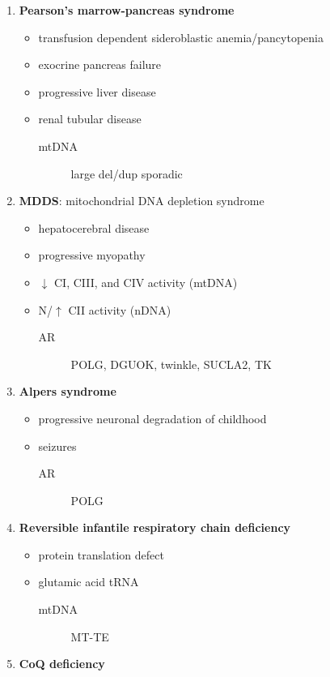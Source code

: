 \documentclass[12pt]{scrartcl}
\begin{document}
\begin{enumerate}
\begin{enumerate}
\item \textbf{Pearson's marrow-pancreas syndrome}
\label{sec:orgdb789b9}
\begin{itemize}
\item transfusion dependent sideroblastic anemia/pancytopenia
\item exocrine pancreas failure
\item progressive liver disease
\item renal tubular disease
\begin{description}
\item[{mtDNA}] large del/dup sporadic
\end{description}
\end{itemize}
\item \textbf{MDDS}: mitochondrial DNA depletion syndrome
\label{sec:org81bf91e}
\begin{itemize}
\item hepatocerebral disease
\item progressive myopathy
\item \(\downarrow\) CI, CIII, and CIV activity (mtDNA)
\item N/\(\uparrow\) CII activity (nDNA)
\begin{description}
\item[{AR}] POLG, DGUOK, twinkle, SUCLA2, TK
\end{description}
\end{itemize}
\item \textbf{Alpers syndrome}
\label{sec:orgfeeb2f9}
\begin{itemize}
\item progressive neuronal degradation of childhood
\item seizures
\begin{description}
\item[{AR}] POLG
\end{description}
\end{itemize}
\item \textbf{Reversible infantile respiratory chain deficiency}
\label{sec:org7e6beae}
\begin{itemize}
\item protein translation defect
\item glutamic acid tRNA
\begin{description}
\item[{mtDNA}] MT-TE
\end{description}
\end{itemize}
\item \textbf{CoQ deficiency}

\end{enumerate}
\end{enumerate}
\end{document}
